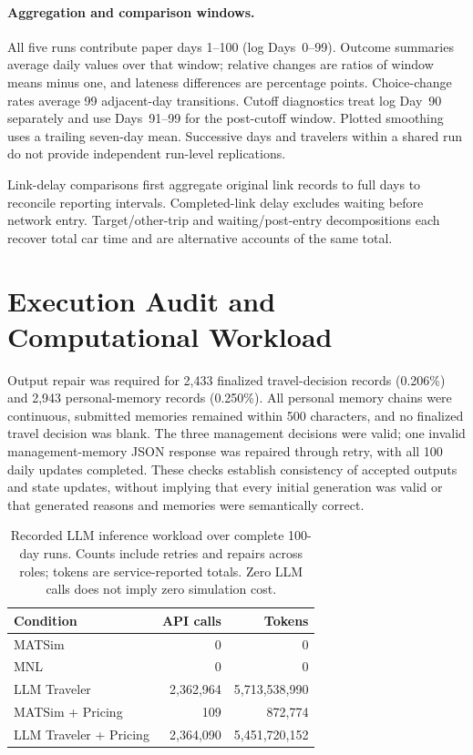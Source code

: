 \paragraph{Aggregation and comparison windows.}
All five runs contribute paper days 1--100 (log Days~0--99). Outcome summaries average daily values over that window; relative changes are ratios of window means minus one, and lateness differences are percentage points. Choice-change rates average 99 adjacent-day transitions. Cutoff diagnostics treat log Day~90 separately and use Days~91--99 for the post-cutoff window. Plotted smoothing uses a trailing seven-day mean. Successive days and travelers within a shared run do not provide independent run-level replications.

Link-delay comparisons first aggregate original link records to full days to reconcile reporting intervals. Completed-link delay excludes waiting before network entry. Target/other-trip and waiting/post-entry decompositions each recover total car time and are alternative accounts of the same total.

\section{Execution Audit and Computational Workload}
\label{app:audit-cost}

Output repair was required for 2,433 finalized travel-decision records (0.206\%) and 2,943 personal-memory records (0.250\%). All personal memory chains were continuous, submitted memories remained within 500 characters, and no finalized travel decision was blank. The three management decisions were valid; one invalid management-memory JSON response was repaired through retry, with all 100 daily updates completed. These checks establish consistency of accepted outputs and state updates, without implying that every initial generation was valid or that generated reasons and memories were semantically correct.

\begin{table}[htbp]
\centering
\small
\caption{Recorded LLM inference workload over complete 100-day runs. Counts include retries and repairs across roles; tokens are service-reported totals. Zero LLM calls does not imply zero simulation cost.}
\label{tab:cost}
\begin{tabularx}{\linewidth}{@{}Xrr@{}}
\toprule
Condition & API calls & Tokens \\
\midrule
MATSim & 0 & 0 \\
MNL & 0 & 0 \\
LLM Traveler & 2,362,964 & 5,713,538,990 \\
MATSim + Pricing & 109 & 872,774 \\
LLM Traveler + Pricing & 2,364,090 & 5,451,720,152 \\
\bottomrule
\end{tabularx}
\end{table}

